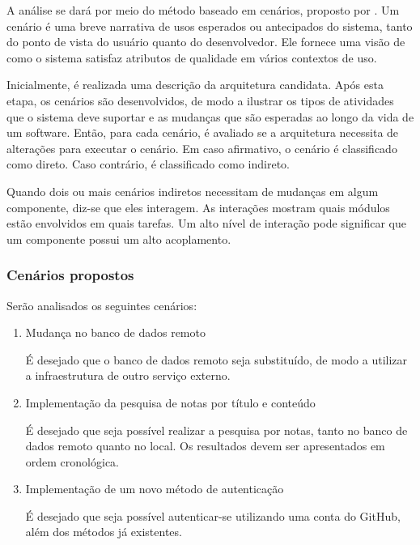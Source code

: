 A análise se dará por meio do método baseado em cenários, proposto por .
Um cenário é uma breve narrativa de usos esperados ou antecipados do sistema, tanto do ponto de vista do usuário quanto do desenvolvedor.
Ele fornece uma visão de como o sistema satisfaz atributos de qualidade em vários contextos de uso.

Inicialmente, é realizada uma descrição da arquitetura candidata.
Após esta etapa, os cenários são desenvolvidos, de modo a ilustrar os tipos de atividades que o sistema deve suportar e as mudanças que são esperadas ao longo da vida de um software.
Então, para cada cenário, é avaliado se a arquitetura necessita de alterações para executar o cenário.
Em caso afirmativo, o cenário é classificado como direto. Caso contrário, é classificado como indireto.

Quando dois ou mais cenários indiretos necessitam de mudanças em algum componente, diz-se que eles interagem.
As interações mostram quais módulos estão envolvidos em quais tarefas.
Um alto nível de interação pode significar que um componente possui um alto acoplamento.

\subsubsection{Cenários propostos}

Serão analisados os seguintes cenários:

\begin{enumerate}
	\item Mudança no banco de dados remoto

	      É desejado que o banco de dados remoto seja substituído, de modo a utilizar a infraestrutura de outro serviço externo.

	\item Implementação da pesquisa de notas por título e conteúdo

	      É desejado que seja possível realizar a pesquisa por notas, tanto no banco de dados remoto quanto no local. Os resultados devem ser apresentados em ordem cronológica.

	\item Implementação de um novo método de autenticação

	      É desejado que seja possível autenticar-se utilizando uma conta do GitHub, além dos métodos já existentes.
\end{enumerate}
